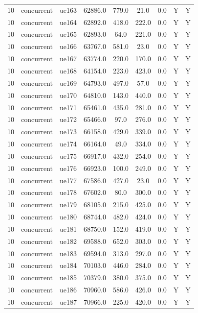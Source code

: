 \begin{table}[ht]
\begin{tabular}{|c|c|c|c|c|c|c|c|c|}
10 & concurrent & ue163 & 62886.0 & 779.0 & 21.0 & 0.0 & Y & Y \\
10 & concurrent & ue164 & 62892.0 & 418.0 & 222.0 & 0.0 & Y & Y \\
10 & concurrent & ue165 & 62893.0 & 64.0 & 221.0 & 0.0 & Y & Y \\
10 & concurrent & ue166 & 63767.0 & 581.0 & 23.0 & 0.0 & Y & Y \\
10 & concurrent & ue167 & 63774.0 & 220.0 & 170.0 & 0.0 & Y & Y \\
10 & concurrent & ue168 & 64154.0 & 223.0 & 423.0 & 0.0 & Y & Y \\
10 & concurrent & ue169 & 64793.0 & 497.0 & 57.0 & 0.0 & Y & Y \\
10 & concurrent & ue170 & 64810.0 & 143.0 & 440.0 & 0.0 & Y & Y \\
10 & concurrent & ue171 & 65461.0 & 435.0 & 281.0 & 0.0 & Y & Y \\
10 & concurrent & ue172 & 65466.0 & 97.0 & 276.0 & 0.0 & Y & Y \\
10 & concurrent & ue173 & 66158.0 & 429.0 & 339.0 & 0.0 & Y & Y \\
10 & concurrent & ue174 & 66164.0 & 49.0 & 334.0 & 0.0 & Y & Y \\
10 & concurrent & ue175 & 66917.0 & 432.0 & 254.0 & 0.0 & Y & Y \\
10 & concurrent & ue176 & 66923.0 & 100.0 & 249.0 & 0.0 & Y & Y \\
10 & concurrent & ue177 & 67586.0 & 427.0 & 23.0 & 0.0 & Y & Y \\
10 & concurrent & ue178 & 67602.0 & 80.0 & 300.0 & 0.0 & Y & Y \\
10 & concurrent & ue179 & 68105.0 & 215.0 & 425.0 & 0.0 & Y & Y \\
10 & concurrent & ue180 & 68744.0 & 482.0 & 424.0 & 0.0 & Y & Y \\
10 & concurrent & ue181 & 68750.0 & 152.0 & 419.0 & 0.0 & Y & Y \\
10 & concurrent & ue182 & 69588.0 & 652.0 & 303.0 & 0.0 & Y & Y \\
10 & concurrent & ue183 & 69594.0 & 313.0 & 297.0 & 0.0 & Y & Y \\
10 & concurrent & ue184 & 70103.0 & 446.0 & 284.0 & 0.0 & Y & Y \\
10 & concurrent & ue185 & 70379.0 & 380.0 & 375.0 & 0.0 & Y & Y \\
10 & concurrent & ue186 & 70960.0 & 586.0 & 426.0 & 0.0 & Y & Y \\
10 & concurrent & ue187 & 70966.0 & 225.0 & 420.0 & 0.0 & Y & Y \\

\end{tabular}
\end{table}
